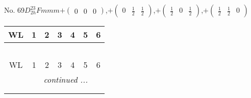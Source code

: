 \documentclass[fleqn,9pt,landscape]{jsarticle}
\begin{document}
\newpage
No. 69\quad$D_{2h}^{23}$\quad$Fmmm$\quad[ orthorhombic ]\quad$+\begin{pmatrix} 0 & 0 & 0 \end{pmatrix}$,\quad $+\begin{pmatrix} 0 & \frac{1}{2} & \frac{1}{2} \end{pmatrix}$,\quad $+\begin{pmatrix} \frac{1}{2} & 0 & \frac{1}{2} \end{pmatrix}$,\quad $+\begin{pmatrix} \frac{1}{2} & \frac{1}{2} & 0 \end{pmatrix}$
\begin{center}
\renewcommand{\arraystretch}{1.2}
\begin{longtable}{ccccccc}
 \hline \hline
WL & 1 & 2 & 3 & 4 & 5 & 6 \\ \hline \endfirsthead

\multicolumn{6}{l}{\tablename\ \thetable{}} \\
 \hline \hline
WL & 1 & 2 & 3 & 4 & 5 & 6 \\ \hline \endhead

 \hline \hline
\multicolumn{6}{r}{\footnotesize\it continued ...} \\ \endfoot

 \hline \hline
\multicolumn{6}{r}{} \\ \endlastfoot


\end{longtable}
\end{center}
\end{document}
